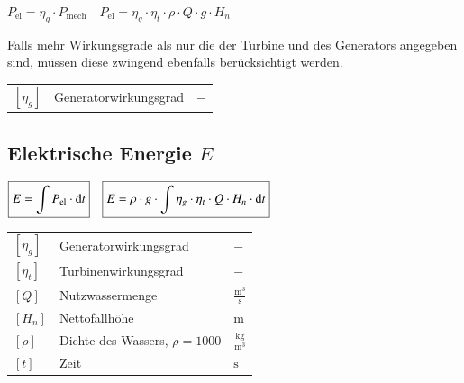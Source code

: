 $
\boxed{P_{\text{el}} = \eta_g \cdot P_{\text{mech}}} 
\quad 
\boxed{P_{\text{el}} = \eta_g \cdot \eta_t \cdot \rho \cdot Q \cdot g \cdot H_n}
$

Falls mehr Wirkungsgrade als nur die der Turbine und des Generators angegeben sind, müssen diese zwingend ebenfalls berücksichtigt werden.

\vspace{0.15cm}

\renewcommand{\arraystretch}{1.2}
\begin{tabular}{@{} l p{6cm} l @{}}
    $[\eta_g]$            & Generatorwirkungsgrad \dotfill                         & $-$ \\
\end{tabular}



\subsection[\texorpdfstring{Elektrische Energie $E$}{Elektrische Energie E}]
            {Elektrische Energie $E$}

$
\boxed{E = \int P_{\text{el}} \cdot \mathop{} \! \mathrm{d} t}
\quad
\boxed{E = \rho \cdot g \cdot \int \eta_g \cdot \eta_t \cdot Q \cdot H_n \cdot \mathop{} \! \mathrm{d} t}
$

\vspace{0.15cm}

\renewcommand{\arraystretch}{1.2}
\begin{tabular}{@{} l p{6cm} l @{}}
    $[\eta_g]$          & Generatorwirkungsgrad \dotfill                         & $-$ \\
    $[\eta_t]$          & Turbinenwirkungsgrad \dotfill                          & $-$ \\
    $[Q]$               & Nutzwassermenge \dotfill                               & $\frac{\text{m}^3}{\text{s}}$ \\
    $[H_n]$             & Nettofallhöhe \dotfill                                 & $\text{m}$ \\
    $[\rho]$            & Dichte des Wassers, $\rho = 1000$ \dotfill             & $\frac{\text{kg}}{\text{m}^3}$ \\
    $[t]$               & Zeit \dotfill                                           & $\text{s}$ \\
\end{tabular}